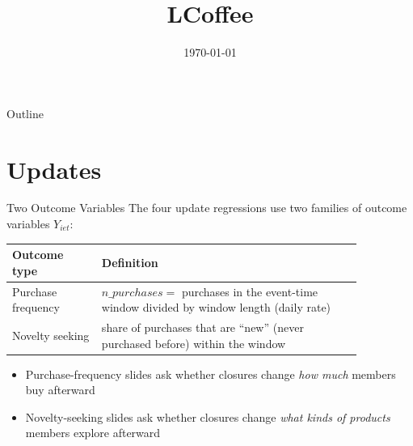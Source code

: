 \documentclass[aspectratio=169]{beamer}  %
\title{LCoffee}
\date{\today}
\begin{document}
\begin{frame}
    \titlepage
\end{frame}

\begin{frame}{Outline}
    \tableofcontents
\end{frame}




\section{Updates}
\begin{frame}{Two Outcome Variables}
\small
The four update regressions use two families of outcome variables $Y_{iet}$:

\begin{table}[h]
\centering
\scriptsize
\begin{tabular}{p{0.22\linewidth} p{0.64\linewidth}}
\toprule
\textbf{Outcome type} & \textbf{Definition} \\
\midrule
Purchase frequency &
$n\_purchases =$ purchases in the event-time window divided by window length (daily rate) \\
Novelty seeking &
share of purchases that are ``new'' (never purchased before) within the window \\
\bottomrule
\end{tabular}
\end{table}

\begin{itemize}
    \item Purchase-frequency slides ask whether closures change \emph{how much} members buy afterward
    \item Novelty-seeking slides ask whether closures change \emph{what kinds of products} members explore afterward
\end{itemize}
\end{frame}
\end{document}
